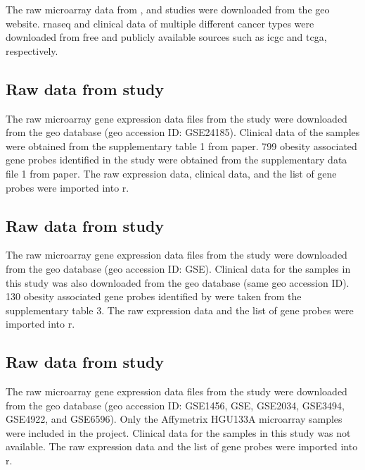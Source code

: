 The raw microarray data from \citet{Creighton2012}, \citet{Fuentes-Mattei2014} and \citet{Gatza2010a}  studies were downloaded from the \gls{geo} website.
\gls{rnaseq} and clinical data of multiple different cancer types were downloaded from free and publicly available sources such as \gls{icgc} and \gls{tcga}, respectively.

\subsection{Raw data from \citet{Creighton2012} study}
\label{subsec:crrawdat}

The raw microarray gene expression data files from the \citet{Creighton2012} study were downloaded from the \gls{geo} database (\gls{geo} accession ID: GSE24185).
Clinical data of the samples were obtained from the supplementary table 1 from \citet{Creighton2012} paper.
799 obesity associated gene probes identified in the \citet{Creighton2012} study were obtained from the supplementary data file 1 from \citet{Creighton2012} paper.
The raw expression data, clinical data, and the list of gene probes were imported into \gls{r}.

\subsection{Raw data from \citet{Fuentes-Mattei2014} study}
\label{subsec:fmrawdat}

The raw microarray gene expression data files from the  \citet{Fuentes-Mattei2014} study were downloaded from the \gls{geo} database (\gls{geo} accession ID: GSE).
Clinical data for the samples in this study was also downloaded from the \gls{geo} database (same \gls{geo} accession ID).
130 obesity associated gene probes identified by \citet{Fuentes-Mattei2014} were taken from the supplementary table 3.
The raw expression data and the list of gene probes were imported into \gls{r}.

\subsection{Raw data from \citet{Gatza2010a} study}
\label{sub:gatzarawdat}

The raw microarray gene expression data files from the \citet{Gatza2010a} study were downloaded from the \gls{geo} database (\gls{geo} accession ID: GSE1456, GSE, GSE2034, GSE3494, GSE4922, and GSE6596).
Only the Affymetrix HGU\-133A microarray samples were included in the project.
Clinical data for the samples in this study was not available.
The raw expression data and the list of gene probes were imported into \gls{r}.

